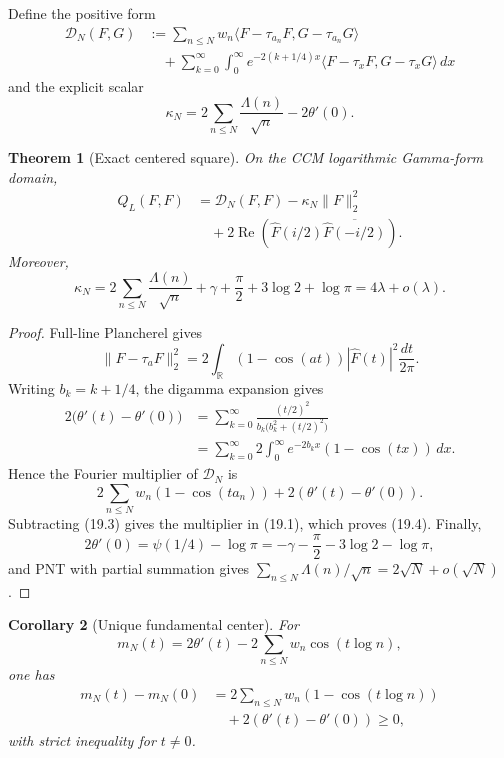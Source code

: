 \documentclass[11pt]{amsart}
\newtheorem{theorem}{Theorem}[section]
\newtheorem{corollary}[theorem]{Corollary}
\theoremstyle{definition}
\theoremstyle{remark}
\newcommand{\R}{\mathbb R}
\begin{document}
Define the positive form
\[
\begin{aligned}
 \mathcal D_N(F,G)
 &:=
 \sum_{n\le N}w_n
 \langle F-\tau_{a_n}F,G-\tau_{a_n}G\rangle\\
 &\quad+
 \sum_{k=0}^{\infty}\int_0^\infty
 e^{-2(k+1/4)x}
 \langle F-\tau_xF,G-\tau_xG\rangle\,dx
\end{aligned}
\tag{19.2}
\]
and the explicit scalar
\[
 \kappa_N
 =
 2\sum_{n\le N}\frac{\Lambda(n)}{\sqrt n}
 -2\theta'(0).
\tag{19.3}
\]

\begin{theorem}[Exact centered square]
\label{thm:centered-square}
On the CCM logarithmic Gamma-form domain,
\[
\boxed{
\begin{aligned}
 Q_L(F,F)
 &=
 \mathcal D_N(F,F)-\kappa_N\|F\|_2^2\\
 &\quad+
 2\operatorname{Re}\!\left(
 \widehat F(i/2)\overline{\widehat F(-i/2)}
 \right).
\end{aligned}}
\tag{19.4}
\]
Moreover,
\[
\boxed{
 \kappa_N
 =
 2\sum_{n\le N}\frac{\Lambda(n)}{\sqrt n}
 +\gamma+\frac\pi2+3\log2+\log\pi
 =4\lambda+o(\lambda).}
\tag{19.5}
\]
\end{theorem}

\begin{proof}
Full-line Plancherel gives
\[
 \|F-\tau_aF\|_2^2
 =
 2\int_\R(1-\cos(at))|\widehat F(t)|^2\frac{dt}{2\pi}.
\tag{19.6}
\]
Writing \(b_k=k+1/4\), the digamma expansion gives
\[
\begin{aligned}
 2\bigl(\theta'(t)-\theta'(0)\bigr)
 &=
 \sum_{k=0}^{\infty}
 \frac{(t/2)^2}{b_k\bigl(b_k^2+(t/2)^2\bigr)}\\
 &=
 \sum_{k=0}^{\infty}
 2\int_0^\infty e^{-2b_kx}(1-\cos(tx))\,dx .
\end{aligned}
\tag{19.7}
\]
Hence the Fourier multiplier of \(\mathcal D_N\) is
\[
 2\sum_{n\le N}w_n(1-\cos(ta_n))
 +2(\theta'(t)-\theta'(0)).
\]
Subtracting (19.3) gives the multiplier in (19.1), which proves
(19.4).  Finally,
\[
 2\theta'(0)=\psi(1/4)-\log\pi
 =-\gamma-\frac\pi2-3\log2-\log\pi,
\]
and PNT with partial summation gives
\(\sum_{n\le N}\Lambda(n)/\sqrt n=2\sqrt N+o(\sqrt N)\).
\end{proof}

\begin{corollary}[Unique fundamental center]
\label{cor:unique-center}
For
\[
 m_N(t)=2\theta'(t)-2\sum_{n\le N}w_n\cos(t\log n),
\]
one has
\[
\boxed{
\begin{aligned}
 m_N(t)-m_N(0)
 &=
 2\sum_{n\le N}w_n(1-\cos(t\log n))\\
 &\quad+2(\theta'(t)-\theta'(0))\ge0,
\end{aligned}}
\tag{19.8}
\]
with strict inequality for \(t\ne0\).
\end{corollary}
\end{document}
